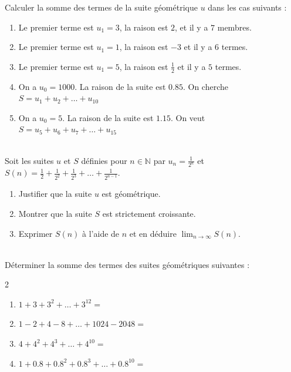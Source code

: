 \documentclass[main.tex]{subfiles}
\begin{document}
\begin{exercise}\label{chapter05:exercise:suites44} Calculer la somme des termes de la suite géométrique $u$ dans les cas suivants :
	\begin{enumerate}[leftmargin=*,label=\arabic*)]
		\item Le premier terme est $u_1=3$, la raison est $2$, et il y a $7$ membres.
		\item Le premier terme est $u_1=1$, la raison est $-3$ et il y a $6$ termes.
		\item Le premier terme est $u_1=5$, la raison est $\tfrac{1}{2}$ et il y a $5$ termes.
		\item On a $u_0=1000$. La raison de la suite est $0.85$. On cherche $S=u_1+ u_{2}+\ldots+u_{10}$ 
		\item On a $u_0=5$. La raison de la suite est $1.15$. On veut $S=u_5+u_6+u_{7}+\ldots+u_{15}$  
	\end{enumerate} 
\end{exercise}
\begin{exercise}\label{chapter05:exercise:suites45} \hfill\\
Soit les suites $u$ et $S$  définies  pour $n\in\mathbb{N}$ par $u_n=\frac{1}{2^n}$ et $S(n)=\frac{1}{2}+\frac{1}{2^2}+\frac{1}{2^3}+\ldots + \frac{1}{2^{n-1}}$.
	\begin{enumerate}[leftmargin=*,label=\arabic*)]
	\item Justifier que la suite $u$ est géométrique.
	\item   Montrer que la suite $S$ est strictement croissante. 
	\item Exprimer $S(n)$ à l'aide de $n$ et en déduire $\lim_{n\to\infty}S(n)$.
 \end{enumerate} 	
\end{exercise} 
\begin{exercise}\label{chapter05:exercise:suites46}\hfill\\
Déterminer la somme des termes des suites géométriques suivantes :
	\begin{spacing}{2}
		\vspace{-0.5em}
		\begin{enumerate}[leftmargin=*,label=\arabic*)]
			\item $1+3+3^2+\ldots +3^{12}=$\dotfill 
			\item $1-2+4-8+\ldots +1024-2048=$\dotfill 
			\item $4+4^2+4^3+\ldots +4^{10} =$\dotfill 
			\item $1+0.8+0.8^2+0.8^3+\ldots + 0.8^{10}=$\dotfill 
		\end{enumerate}
	\end{spacing}
	\vspace{-0.75em}
\end{exercise} 
\end{document}
